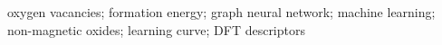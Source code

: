oxygen vacancies; formation energy; graph neural network; machine learning; non-magnetic oxides; learning curve; DFT descriptors
